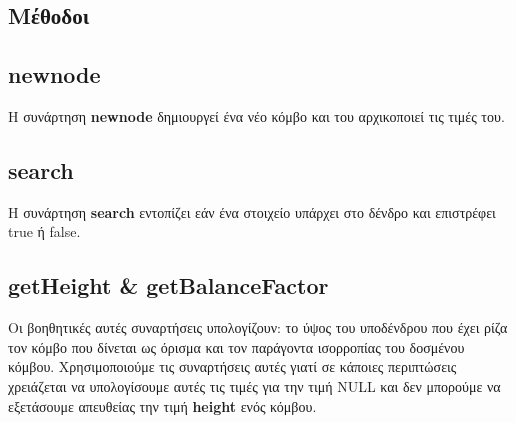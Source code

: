 \documentclass[12pt,a4paper]{article}
\begin{document}
    \subsection*{Μέθοδοι}
    \subsection{newnode}\label{newnode}
    Η συνάρτηση \textbf{newnode} δημιουργεί ένα νέο κόμβο και του αρχικοποιεί τις τιμές του.
    \subsection{search}
    Η συνάρτηση \textbf{search} εντοπίζει εάν ένα στοιχείο υπάρχει στο δένδρο και επιστρέφει true ή false.
    \subsection{getHeight \& getBalanceFactor}
    Οι βοηθητικές αυτές συναρτήσεις υπολογίζουν: το ύψος του υποδένδρου που έχει ρίζα τον κόμβο που δίνεται ως όρισμα και τον παράγοντα ισορροπίας του 
    δοσμένου κόμβου. Χρησιμοποιούμε τις συναρτήσεις αυτές γιατί σε κάποιες περιπτώσεις χρειάζεται να υπολογίσουμε αυτές τις τιμές για την τιμή NULL και 
    δεν μπορούμε να εξετάσουμε απευθείας την τιμή \textbf{height} ενός κόμβου.
\end{document}
